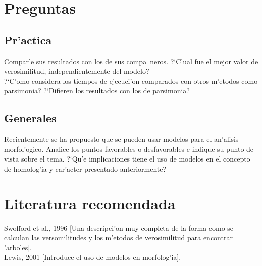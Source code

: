 \section{Preguntas}
\subsection{Pr'actica}
\noindent
Compar'e sus resultados con los de sus compa~neros. ?`C'ual fue el mejor valor de verosimilitud, independientemente del modelo?\\
?`C'omo considera los tiempos de ejecuci'on comparados con otros m'etodos como parsimonia? ?`Difieren los resultados con los de parsimonia?
\subsection{Generales}
\noindent
Recientemente se ha propuesto que se pueden usar modelos para el an'alisis morfol'ogico. Analice los puntos favorables o desfavorables e indique su punto de vista sobre el tema. ?`Qu'e implicaciones tiene el uso de modelos en el concepto de homolog'ia y car'acter presentado anteriormente?
\section{Literatura recomendada}
\noindent
Swofford et al., 1996 [Una descripci'on muy completa de la forma como se calculan las versomilitudes y los m'etodos de verosimilitud para encontrar 'arboles].\\
Lewis, 2001 [Introduce el uso de modelos en morfolog'ia].